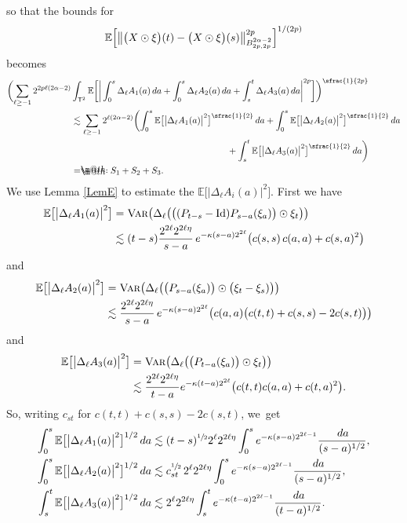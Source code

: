 \documentclass[JEP,XML,SOM,Unicode,published]{cedram}
\makeatletter
\theoremstyle{definition}
\newcommand\bbE{\mathbb{E}}
\newcommand*{\eqdef}{=\mathrel{\rlap{%
\raisebox{0.3ex}{$\m@th\cdot$}}%
\raisebox{-0.3ex}{$\m@th\cdot$}}%
}
\makeatother
\begin{document}
so that the bounds for
\[
\bbE\Bigl[\big\Vert\bigl(X\odot\xi\bigr)(t)-\bigl(X\odot\xi\bigr)(s)\big\Vert_{B^{2\alpha-2}_{2p,2p}}^{2p}\Bigr]^{1/(2p)}
\]
becomes
\begin{align*}
\biggl( \sum_{\ell\geq -1} 2^{2p\ell(2\alpha-2)}&\int_{\mathsf{T}^2} \bbE\biggl[ \bigg| \int_0^s \Delta_\ell A_1(a)\,da + \int_0^s \Delta_\ell A_2(a)\,da + \int_s^t \Delta_\ell A_3(a)\,da \bigg|^{2p}\biggr] \biggr)^{\sfrac{1}{2p}} \\
&\lesssim \sum_{\ell\geq -1} 2^{\ell(2\alpha-2)}\biggl(\int_0^s \bbE\bigl[\big| \Delta_\ell A_1(a)\big|^2 \bigr]^{\sfrac{1}{2}} \,da + \int_0^s \bbE\bigl[\big| \Delta_\ell A_2(a)\big|^2 \bigr]^{\sfrac{1}{2}} \,da \\
&\hspace*{6.1cm}+ \int_s^t \bbE\bigl[\big| \Delta_\ell A_3(a)\big|^2 \bigr]^{\sfrac{1}{2}} \,da \biggr) \\
&\eqdef S_1+S_2+S_3.
\end{align*}
We use Lemma \ref{LemE} to estimate the $\bbE\bigl[\big| \Delta_\ell A_i(a)\big|^2 \bigr]$. First we have
\begin{align*}
\bbE\bigl[\big| \Delta_\ell A_1(a)\big|^2 \bigr] &= \textsc{{Var}}\bigl( \Delta_\ell \bigl(\bigl( (P_{t-s} - \textrm{Id})P_{s-a}(\xi_a) \bigr)\odot\xi_t\bigr)\bigr)
\\
&\lesssim (t-s)\frac{2^{2\ell}2^{2\ell\eta}}{s-a}\,e^{-\kappa(s-a)2^{2\ell}}\bigl(c(s,s)\,c(a,a) + c(s,a)^2 \bigr)
\end{align*}
and
\begin{align*}
\bbE\bigl[\big| \Delta_\ell A_2(a)\big|^2 \bigr] &= \textsc{{Var}}\bigl( \Delta_\ell \bigl(\bigl( P_{s-a}(\xi_a) \bigr)\odot\bigl(\xi_t-\xi_s)\bigr)\bigr)
\\
&\lesssim \frac{2^{2\ell}2^{2\ell\eta}}{s-a} \, e^{-\kappa(s-a)2^{2\ell}} \bigl( c(a,a)\bigl(c(t,t) + c(s,s) - 2c(s,t)\bigr) \bigr)
\end{align*}
and
\begin{align*}
\bbE\bigl[\big| \Delta_\ell A_3(a)\big|^2 \bigr] &= \textsc{{Var}}\bigl( \Delta_\ell \bigl(\bigl( P_{t-a}(\xi_a) \bigr)\odot\xi_t\bigr)\bigr)
\\
&\lesssim \frac{2^{2\ell}2^{2\ell\eta}}{t-a}e^{-\kappa(t-a)2^{2\ell}}\bigl( c(t,t) c(a,a) + c(t,a)^2 \bigr).
\end{align*}
So, writing $c_{st}$ for $c(t,t)+c(s,s)-2c(s,t)$, we~get
\begin{align*}
\int_0^s \bbE\bigl[\big| \Delta_\ell A_1(a)\big|^2 \bigr]^{1/2} \,da &\lesssim (t-s)^{\sfrac{1}{2}} 2^\ell 2^{2\ell\eta} \int_0^s e^{-\kappa(s-a)2^{2\ell-1}}\frac{\,da}{(s-a)^{1/2}},
\\
\int_0^s \bbE\bigl[\big| \Delta_\ell A_2(a)\big|^2 \bigr]^{1/2} \,da &\lesssim c_{st}^{\sfrac{1}{2}} \, 2^\ell 2^{2\ell\eta}\int_0^s e^{-\kappa(s-a)2^{2\ell-1}}\frac{\,da}{(s-a)^{1/2}},
\\
\int_s^t \bbE\bigl[\big| \Delta_\ell A_3(a)\big|^2 \bigr]^{1/2} \,da &\lesssim 2^\ell 2^{2\ell\eta}\int_s^t e^{-\kappa(t-a)2^{2\ell-1}}\frac{\,da}{(t-a)^{1/2}}.
\end{align*}
\end{document}
